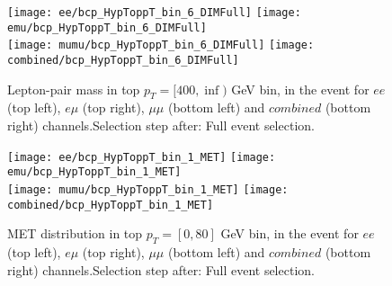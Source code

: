 \begin{figure}
  \texttt{[image: ee/bcp\_HypToppT\_bin\_6\_DIMFull]}
  \texttt{[image: emu/bcp\_HypToppT\_bin\_6\_DIMFull]}\\
  \texttt{[image: mumu/bcp\_HypToppT\_bin\_6\_DIMFull]}
  \texttt{[image: combined/bcp\_HypToppT\_bin\_6\_DIMFull]}
\caption{Lepton-pair mass in top $p_T = [400,\inf)$ GeV bin, in the event for $ee$ (top left), $e\mu$ (top right), $\mu\mu$ (bottom left) and $combined$ (bottom right) channels.\newline Selection step after: Full event selection.}
\end{figure}

\clearpage
\newpage







% 
% 

\begin{figure}
  \texttt{[image: ee/bcp\_HypToppT\_bin\_1\_MET]}
  \texttt{[image: emu/bcp\_HypToppT\_bin\_1\_MET]}\\
  \texttt{[image: mumu/bcp\_HypToppT\_bin\_1\_MET]}
  \texttt{[image: combined/bcp\_HypToppT\_bin\_1\_MET]}
\caption{MET distribution in top $p_T = [0,80]$ GeV bin, in the event for $ee$ (top left), $e\mu$ (top right), $\mu\mu$ (bottom left) and $combined$ (bottom right) channels.\newline Selection step after: Full event selection.}
\end{figure}

